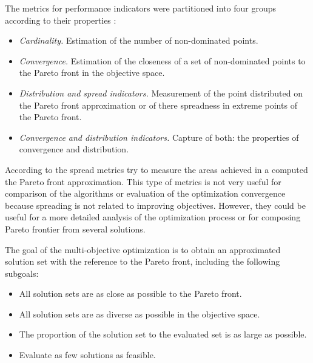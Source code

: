             The metrics for performance indicators were partitioned into four groups according to their properties \cite{Audet2018PerformanceII}: 
            \begin{itemize}
                \item \textit{Cardinality.} Estimation of the number of non-dominated points.
                \item \textit{Convergence.} Estimation of the closeness of a set of non-dominated points to the Pareto front in the objective space.
                \item \textit{Distribution and spread indicators.}  Measurement of the point distributed on the Pareto front approximation or of there spreadness in extreme points of the Pareto front.
                \item \textit{Convergence and distribution indicators.} Capture of both: the properties of convergence and distribution.
            \end{itemize}

            According to \cite{CustodioMVV11} the spread metrics try to measure the areas achieved in a computed the Pareto front approximation. This type of metrics is not very useful for comparison of the algorithms or evaluation of the optimization convergence because spreading is not related to improving objectives. However, they could be useful for a more detailed analysis of the optimization process or for composing Pareto frontier from several solutions.

            The goal of the multi-objective optimization is to obtain an approximated solution set with the reference to the Pareto front, including the following subgoals:
            \begin{itemize}
                \item All solution sets are as close as possible to the Pareto front.
                \item All solution sets are as diverse as possible in the objective space.
                \item The proportion of the solution set to the evaluated set is as large as possible. 
                \item Evaluate as few solutions as feasible.
            \end{itemize}


